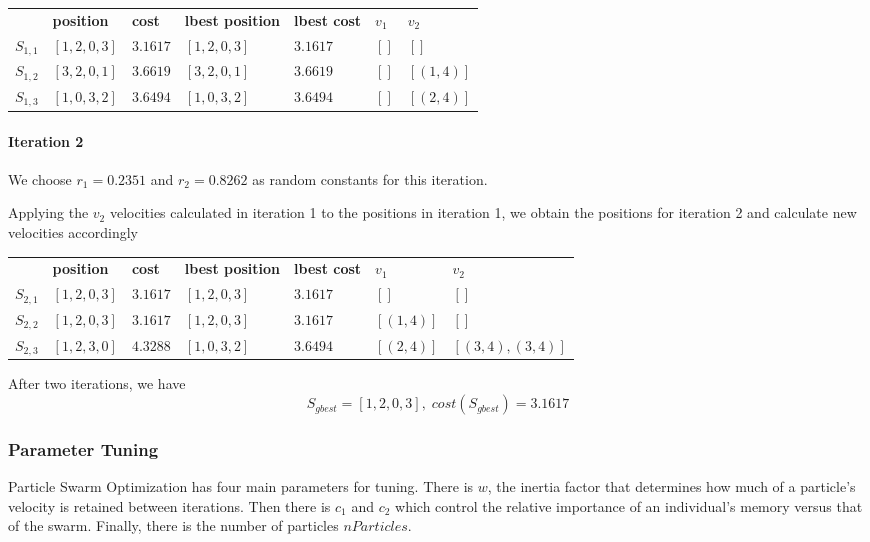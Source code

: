 \documentclass[a4paper]{article}
\newcommand{\subsubsubsection}[1]{\paragraph{#1} \mbox{}}
\begin{document}
\begin{center}
\begin{tabular}{lllllll}
          & \textbf{position} & \textbf{cost} & \textbf{lbest position} & \textbf{lbest cost} & $v_1$ & $v_2$            \\
$S_{1,1}$ & $[1, 2, 0, 3]$    & $3.1617$      & $[1, 2, 0, 3]$          & $3.1617$            & $[]$  & $[]      $ \\
$S_{1,2}$ & $[3, 2, 0, 1]$    & $3.6619$      & $[3, 2, 0, 1]$          & $3.6619$            & $[]$  & $[(1, 4)]$ \\
$S_{1,3}$ & $[1, 0, 3, 2]$    & $3.6494$      & $[1, 0, 3, 2]$          & $3.6494$            & $[]$  & $[(2, 4)]$ \\
\end{tabular}
\end{center}
\vspace{1.5em}

\subsubsubsection{Iteration 2}

We choose $r_1 = 0.2351$ and $r_2 = 0.8262$ as random constants for this
iteration.

Applying the $v_2$ velocities calculated in iteration 1 to the positions in
iteration 1, we obtain the positions for iteration 2 and calculate new
velocities accordingly
\begin{center}
\begin{tabular}{lllllll}
          & \textbf{position} & \textbf{cost} & \textbf{lbest position} & \textbf{lbest cost} & $v_1$      & $v_2$            \\
$S_{2,1}$ & $[1, 2, 0, 3]$    & $3.1617$      & $[1, 2, 0, 3]$          & $3.1617$            & $[]      $ & $[]$             \\
$S_{2,2}$ & $[1, 2, 0, 3]$    & $3.1617$      & $[1, 2, 0, 3]$          & $3.1617$            & $[(1, 4)]$ & $[]$             \\
$S_{2,3}$ & $[1, 2, 3, 0]$    & $4.3288$      & $[1, 0, 3, 2]$          & $3.6494$            & $[(2, 4)]$ & $[(3,4), (3,4)]$ \\
\end{tabular}
\end{center}
\vspace{1.5em}

After two iterations, we have
$$S_\mathit{gbest} = [1, 2, 0, 3], \; cost(S_\mathit{gbest}) = 3.1617$$

\subsubsection{Parameter Tuning}
Particle Swarm Optimization has four main parameters for tuning. There is $w$, the inertia factor that determines how much of a particle's velocity is retained between iterations.
Then there is $c_1$ and $c_2$ which control the relative importance of an individual's memory versus that of the swarm.
Finally, there is the number of particles $nParticles$.\\
\end{document}

